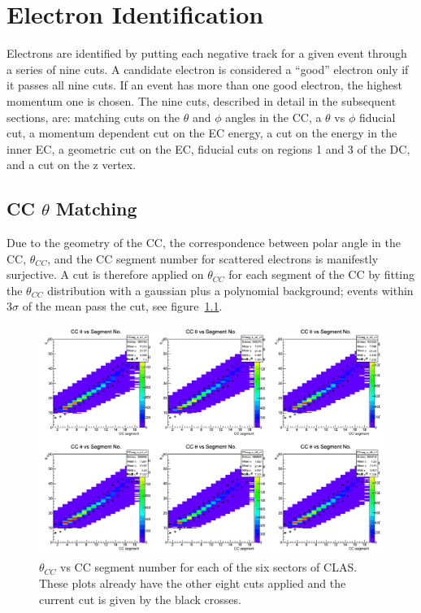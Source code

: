 \clearpage
%
\chapter{Electron Identification}
\label{cha:eID}
%
Electrons are identified by putting each negative track for a given event through a series of nine cuts.
A candidate electron is considered a ``good'' electron only if it passes all nine cuts.
If an event has more than one good electron, the highest momentum one is chosen.
The nine cuts, described in detail in the subsequent sections, are: matching cuts on the $\theta$ and $\phi$ angles in the CC, a $\theta$ vs $\phi$ fiducial cut, a momentum dependent cut on the EC energy, a cut on the energy in the inner EC, a geometric cut on the EC, fiducial cuts on regions 1 and 3 of the DC, and a cut on the z vertex.
%

\section{CC $\theta$ Matching}
\label{sec:CCthetaMatching}
%
Due to the geometry of the CC, the correspondence between polar angle in the CC, $\theta_{CC}$, and the CC segment number for scattered electrons is manifestly surjective.
A cut is therefore applied on $\theta_{CC}$ for each segment of the CC by fitting the $\theta_{CC}$ distribution with a gaussian plus a polynomial background; events within 3$\sigma$ of the mean pass the cut, see figure~\ref{fig:CCseg_c1}.
%
\begin{figure}[htp]
\centering
\includegraphics[width=5in]{figures/CCseg_c1.png}
\caption{$\theta_{CC}$ vs CC segment number for each of the six sectors of CLAS. These plots already have the other eight cuts applied and the current cut is given by the black crosses.}
\label{fig:CCseg_c1}
\end{figure}
%
%
